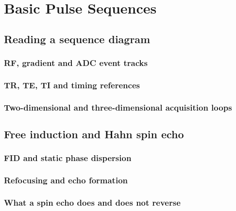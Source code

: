 \chapter{Basic Pulse Sequences}
\label{ch:07}

\section{Reading a sequence diagram}
\label{sec:07:reading-a-sequence-diagram}
\subsection{RF, gradient and ADC event tracks}
\subsection{TR, TE, TI and timing references}
\subsection{Two-dimensional and three-dimensional acquisition loops}

\section{Free induction and Hahn spin echo}
\label{sec:07:free-induction-and-hahn-spin-echo}
\subsection{FID and static phase dispersion}
\subsection{Refocusing and echo formation}
\subsection{What a spin echo does and does not reverse}

